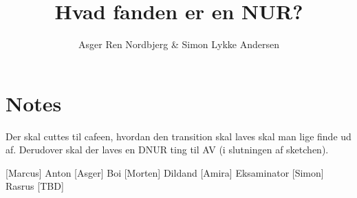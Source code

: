 \documentclass{article}
\title{Hvad fanden er en NUR?}                   %
\author{Asger Ren Nordbjerg \& Simon Lykke Andersen}  %
\begin{document}
                
\maketitle
\section*{Notes}
Der skal cuttes til cafeen, hvordan den transition skal laves skal man lige finde ud af.
Derudover skal der laves en DNUR ting til AV (i slutningen af sketchen).
    
\begin{roles}
 [Marcus] Anton
 [Asger] Boi
 [Morten] Dildand
 [Amira] Eksaminator
 [Simon] Rasrus
 [TBD]
\end{roles}

\begin{props}
\end{props}
\end{document}
